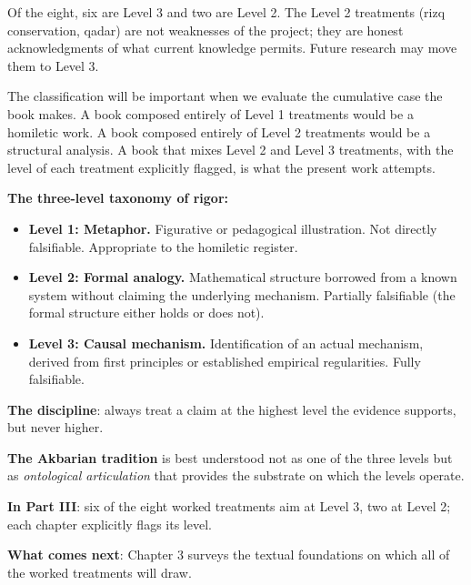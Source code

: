 Of the eight, six are Level 3 and two are Level 2. The Level 2
treatments (rizq conservation, qadar) are not weaknesses of the
project; they are honest acknowledgments of what current knowledge
permits. Future research may move them to Level 3.

The classification will be important when we evaluate the cumulative
case the book makes. A book composed entirely of Level 1 treatments
would be a homiletic work. A book composed entirely of Level 2
treatments would be a structural analysis. A book that mixes Level 2
and Level 3 treatments, with the level of each treatment explicitly
flagged, is what the present work attempts.

\begin{summarybox}
\textbf{The three-level taxonomy of rigor:}
\begin{itemize}[leftmargin=1.5em]
    \item \textbf{Level 1: Metaphor.} Figurative or pedagogical
    illustration. Not directly falsifiable. Appropriate to the
    homiletic register.
    \item \textbf{Level 2: Formal analogy.} Mathematical structure
    borrowed from a known system without claiming the underlying
    mechanism. Partially falsifiable (the formal structure either
    holds or does not).
    \item \textbf{Level 3: Causal mechanism.} Identification of an
    actual mechanism, derived from first principles or established
    empirical regularities. Fully falsifiable.
\end{itemize}

\textbf{The discipline}: always treat a claim at the highest level
the evidence supports, but never higher.

\textbf{The Akbarian tradition} is best understood not as one of the
three levels but as \emph{ontological articulation} that provides
the substrate on which the levels operate.

\textbf{In Part III}: six of the eight worked treatments aim at
Level 3, two at Level 2; each chapter explicitly flags its level.

\textbf{What comes next}: Chapter 3 surveys the textual foundations
on which all of the worked treatments will draw.
\end{summarybox}

\cleardoublepage
